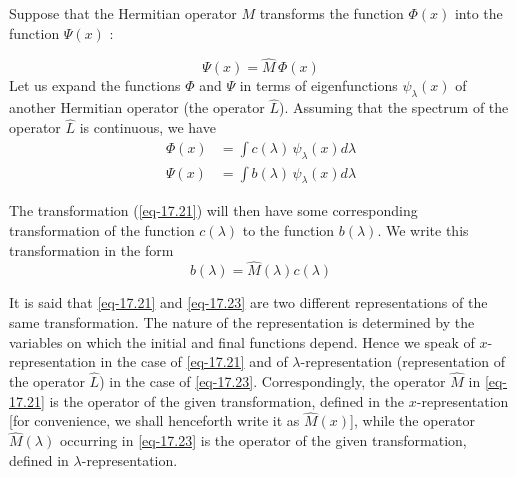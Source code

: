 \documentclass[a4paper,sfsidenotes,colorlinks=true]{tufte-book}
\numberwithin{equation}{section}
\numberwithin{figure}{section}
\begin{document}
Suppose  that the Hermitian operator $M$
transforms the function $\Phi (x)$ into the function $\Psi (x)$ :

\begin{equation}%
\Psi (x) = \hat{M} \, \Phi (x) 
\label{eq-17.21}
\end{equation}
Let us expand the functions $\Phi$ and $\Psi$ in terms of
eigenfunctions $\psi_{\lambda} (x)$ of another Hermitian operator (the operator
$\hat{L}$). Assuming that the spectrum of the operator $\hat{L}$ is continuous, we
have 
\begin{equation}%
\begin{split}
\Phi(x) & = \int c (\lambda) \, \psi_{\lambda} (x) d \lambda \\
\Psi(x) & = \int b (\lambda) \, \psi_{\lambda} (x) d \lambda 
\end{split}
\label{eq-17.22}
\end{equation}

The transformation (\ref{eq-17.21}) will then have some corresponding
transformation of the function $c (\lambda)$ to the function $b (\lambda)$. We write
this transformation in the form 
\begin{equation}%
b (\lambda) = \hat{M} (\lambda) c (\lambda)
\label{eq-17.23}
\end{equation}

It is said that \ref{eq-17.21} and \ref{eq-17.23} are two different
representations of the same transformation. The nature of the
representation is determined by the variables on which the initial and
final functions depend. Hence we speak of $x$-representation in the case
of \ref{eq-17.21} and of $\lambda$-representation (representation of the
operator $\hat{L}$) in the case of \ref{eq-17.23}. Correspondingly, the
operator $\hat{M}$ in \ref{eq-17.21} is the operator of the given
transformation, defined in the $x$-representation [for convenience, we
shall henceforth write it as $\hat{M} (x)$], while the operator $\hat{M} (\lambda)$
occurring in \ref{eq-17.23} is the operator of the given
transformation, defined in $\lambda$-representation.
\end{document}
